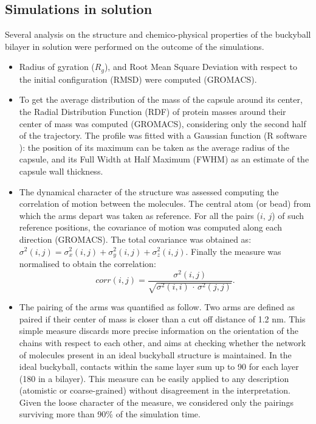\subsection{Simulations in solution}
Several analysis on the structure and chemico-physical properties of the buckyball bilayer in solution were performed on the outcome of the simulations.

\begin{itemize}
\item Radius of gyration ($R_g$), and Root Mean Square Deviation with respect to the initial configuration (RMSD) were computed (GROMACS).

\item To get the average distribution of the mass of the capsule around its center, the Radial Distribution Function (RDF) of protein masses around their center of mass was computed (GROMACS), considering only the second half of the trajectory. The profile was fitted with a Gaussian function (R software \citep{R}): the position of its maximum can be taken as the average radius of the capsule, and its Full Width at Half Maximum (FWHM) as an estimate of the capsule wall thickness.

\item The dynamical character of the structure was assessed computing the correlation of motion between the molecules. The central atom (or bead) from which the arms depart was taken as reference. For all the pairs ($i, \, j$) of such reference positions, the covariance of motion was computed along each direction (GROMACS). The total covariance was obtained as: $\sigma^2(i,j) = \sigma_x^2(i,j) + \sigma_y^2(i,j) + \sigma_z^2(i,j)$. Finally the measure was normalised to obtain the correlation:
\begin{equation}
corr(i,j) = \frac{\sigma^2(i,j)}{\sqrt{\sigma^2(i,i)\,\cdot\,\sigma^2(j,j)}}.
\end{equation}

\item The pairing of the arms was quantified as follow. Two arms are defined as paired if their center of mass is closer than a cut off distance of 1.2 nm. This simple measure discards more precise information on the orientation of the chains with respect to each other, and aims at checking whether the network of molecules present in an ideal buckyball structure is maintained. In the ideal buckyball, contacts within the same layer sum up to 90 for each layer (180 in a bilayer). This measure can be easily applied to any description (atomistic or coarse-grained) without disagreement in the interpretation. Given the loose character of the measure, we considered only the pairings surviving more than 90\% of the simulation time.


\end{itemize}
